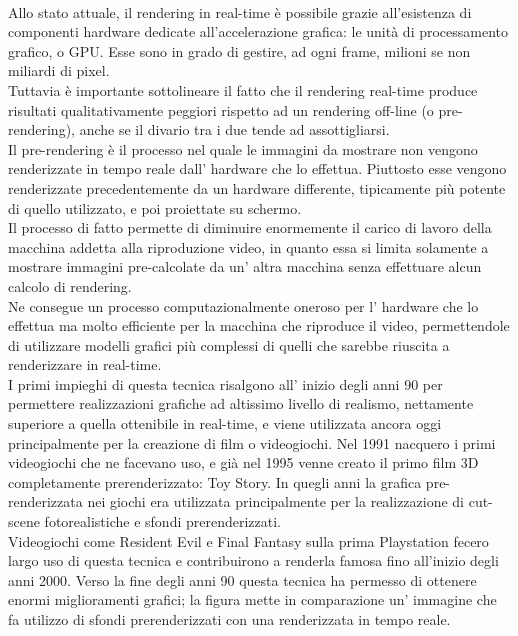 \\ 
Allo stato attuale, il rendering in real-time è possibile grazie all’esistenza di componenti hardware dedicate all’accelerazione grafica: le unità di processamento grafico, o GPU. 
Esse sono in grado di gestire, ad ogni frame, milioni se non miliardi di pixel. 
\\
Tuttavia è importante sottolineare il fatto che il rendering real-time produce risultati qualitativamente peggiori rispetto ad un rendering off-line (o pre-rendering), anche se il divario tra i due tende ad assottigliarsi. 
\\

Il pre-rendering è il processo nel quale le immagini da mostrare non vengono renderizzate in tempo reale dall’ hardware che lo effettua. Piuttosto esse vengono renderizzate precedentemente da un hardware differente, tipicamente più potente di quello utilizzato, e poi proiettate su schermo.
\\
Il processo di fatto permette di diminuire enormemente il carico di lavoro della macchina addetta alla riproduzione video, in quanto essa si limita solamente a mostrare immagini pre-calcolate da un’ altra macchina senza effettuare alcun calcolo di rendering.
\\
Ne consegue un processo computazionalmente oneroso per l’ hardware che lo effettua ma molto efficiente per la macchina che riproduce il video, permettendole di utilizzare modelli grafici più complessi di quelli che sarebbe riuscita a renderizzare in real-time.
\\
I primi impieghi di questa tecnica risalgono all’ inizio degli anni 90 per permettere realizzazioni grafiche ad altissimo livello di realismo, nettamente superiore a quella ottenibile in real-time, e viene utilizzata ancora oggi principalmente per la creazione di film o videogiochi.
Nel 1991 nacquero i primi videogiochi che ne facevano uso, e già nel 1995 venne creato il primo film 3D completamente prerenderizzato: Toy Story.
In quegli anni la grafica pre-renderizzata nei giochi era utilizzata principalmente per la realizzazione di cut-scene fotorealistiche e sfondi prerenderizzati.
\\
Videogiochi come Resident Evil e Final Fantasy sulla prima Playstation fecero largo uso di questa tecnica e contribuirono a renderla famosa fino all’inizio degli anni 2000. 
Verso la fine degli anni 90 questa tecnica ha permesso di ottenere enormi miglioramenti grafici; la figura mette in comparazione un’ immagine che fa utilizzo di sfondi prerenderizzati con una renderizzata in tempo reale.
